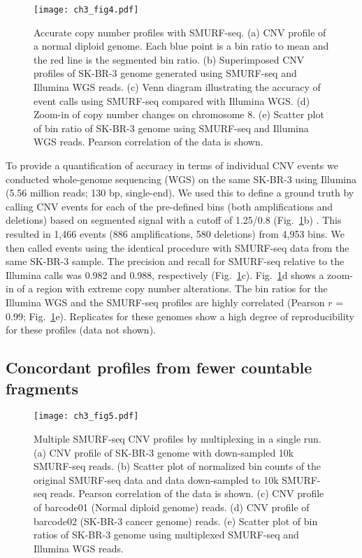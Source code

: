 \begin{figure}[b!]
\centering
\texttt{[image: ch3\_fig4.pdf]}
\caption{ Accurate copy number profiles with SMURF-seq.
  (a) CNV profile of a normal diploid genome. Each blue point is a
  bin ratio to mean and the red line is the segmented bin ratio.
  (b) Superimposed CNV profiles of SK-BR-3 genome generated using SMURF-seq
  and Illumina WGS reads.
  (c) Venn diagram illustrating the accuracy of event calls using SMURF-seq
  compared with Illumina WGS.
  (d) Zoom-in of copy number changes on chromosome 8.
  (e) Scatter plot of bin ratio of SK-BR-3 genome using
  SMURF-seq and Illumina WGS reads. Pearson correlation of the data is shown.}
\label{cnv}
\end{figure}

To provide a quantification of accuracy in terms of individual CNV
events we conducted whole-genome sequencing (WGS) on the same SK-BR-3
using Illumina (5.56 million reads; 130 bp, single-end).  We used this
to define a ground truth by calling CNV events for each of the
pre-defined bins (both amplifications and deletions) based on segmented
signal with a cutoff of 1.25/0.8 (Fig.~\ref{cnv}b)
\cite{dago2014rapid,berry2017potential}. This resulted in 1,466 events
(886 amplifications, 580 deletions) from 4,953 bins. We then called
events using the identical procedure with SMURF-seq data from the same
SK-BR-3 sample. The precision and recall for SMURF-seq relative to the
Illumina calls was 0.982 and 0.988, respectively (Fig.~\ref{cnv}c).
Fig.~\ref{cnv}d shows a zoom-in of a region with extreme copy number
alterations. The bin ratios for the Illumina WGS and the SMURF-seq
profiles are highly correlated (Pearson $r$ = 0.99; Fig.~\ref{cnv}e).
Replicates for these genomes show a high degree of reproducibility for
these profiles (data not shown).

\subsection{Concordant profiles from fewer countable fragments}
\begin{figure}[t!]
\centering
\texttt{[image: ch3\_fig5.pdf]}
\caption{Multiple SMURF-seq CNV profiles by multiplexing in a single run.
  (a) CNV profile of SK-BR-3 genome with down-sampled 10k SMURF-seq reads.
  (b) Scatter plot of normalized bin counts of the original SMURF-seq
  data and data down-sampled to 10k SMURF-seq reads. Pearson
  correlation of the data is shown.
  (c) CNV profile of barcode01 (Normal diploid genome) reads.
  (d) CNV profile of barcode02 (SK-BR-3 cancer genome) reads.
  (e) Scatter plot of bin ratios of SK-BR-3 genome using
  multiplexed SMURF-seq and Illumina WGS reads.}
\label{cnv_mux}
\end{figure}

